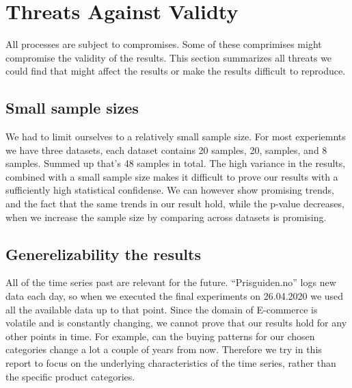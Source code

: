 \section{Threats Against Validty}
\label{section:Discussion:Threats}
All processes are subject to compromises. Some of these comprimises might compromise the validity of
the results. This section summarizes all threats we could find that might affect the results or make
the results difficult to reproduce.

\subsection{Small sample sizes}
We had to limit ourselves to a relatively small sample size. For most experiemnts we have
three datasets, each dataset contains 20 samples, 20, samples, and 8 samples.
Summed up that's 48 samples in total. The high variance in the results, combined with a small sample size
makes it difficult to prove our results with a sufficiently high statistical confidense.
We can however show promising trends, and the fact that the same trends in our result hold, while
the p-value decreases, when
we increase the sample size by comparing across datasets is promising.




\subsection{Generelizability the results}
All of the time series past are relevant for the future. ``Prisguiden.no'' logs new data each day,
so when we executed the final experiments on 26.04.2020 we used all the available data up to that point.
Since the domain of E-commerce is volatile and is constantly changing, we cannot prove that our
results hold for any other points in time. For example, can the buying patterns for our chosen categories
change a lot a couple of years from now.
Therefore we try in this report to focus on the underlying characteristics of the time series, rather than
the specific product categories.

